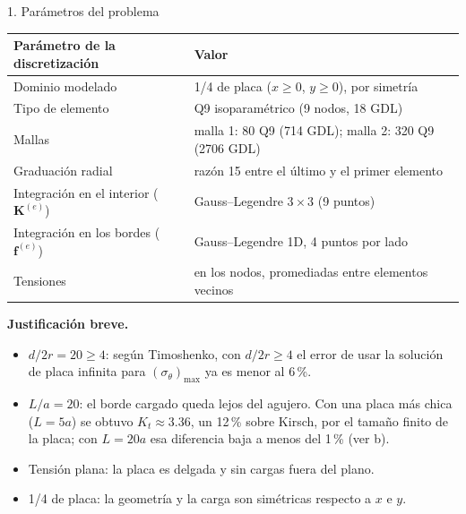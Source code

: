 \begin{desarrollo}{1. Par\'ametros del problema}
\begin{center}
\renewcommand{\arraystretch}{1.2}
\begin{tabular}{@{}ll@{}}
\toprule
Par\'ametro de la discretizaci\'on & Valor \\
\midrule
Dominio modelado & 1/4 de placa ($x\ge0$, $y\ge0$), por simetr\'ia \\
Tipo de elemento & Q9 isoparam\'etrico (9 nodos, 18 GDL) \\
Mallas & malla 1: 80 Q9 (714 GDL); malla 2: 320 Q9 (2706 GDL) \\
Graduaci\'on radial & raz\'on 15 entre el \'ultimo y el primer elemento \\
Integraci\'on en el interior ($\mathbf{K}^{(e)}$) & Gauss--Legendre $3\times3$ (9 puntos) \\
Integraci\'on en los bordes ($\mathbf{f}^{(e)}$) & Gauss--Legendre 1D, 4 puntos por lado \\
Tensiones & en los nodos, promediadas entre elementos vecinos \\
\bottomrule
\end{tabular}
\end{center}

\textbf{Justificaci\'on breve.}
\begin{itemize}[itemsep=2pt]
  \item $d/2r=20\ge4$: seg\'un Timoshenko, con $d/2r\ge4$ el error de usar la
  soluci\'on de placa infinita para $(\sigma_\theta)_{\max}$ ya es menor al 6\,\%.
  \item $L/a=20$: el borde cargado queda lejos del agujero. Con una placa m\'as
  chica ($L=5a$) se obtuvo $K_t\approx3.36$, un 12\,\% sobre Kirsch, por el
  tama\~no finito de la placa; con $L=20a$ esa diferencia baja a menos del 1\,\%
  (ver b).
  \item Tensi\'on plana: la placa es delgada y sin cargas fuera del plano.
  \item 1/4 de placa: la geometr\'ia y la carga son sim\'etricas respecto a $x$ e $y$.
\end{itemize}
\end{desarrollo}

